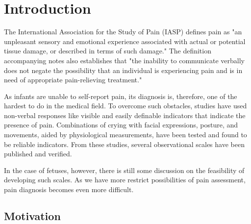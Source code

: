\documentclass[msc]{ppgccufmg}
\begin{document}

\chapter{Introduction}

The International Association for the Study of Pain (IASP) defines pain as "an unpleasant sensory and emotional experience associated with actual or potential tissue damage, or described in terms of such damage." The definition accompanying notes also establishes that "the inability to communicate verbally does not negate the possibility that an individual is experiencing pain and is in need of appropriate pain-relieving treatment." 


As infants are unable to self-report pain, its diagnosis is, therefore, one of the hardest to do in the medical field. To overcome such obstacles, studies have used non-verbal responses like visible and easily definable indicators that indicate the presence of pain. Combinations of crying with facial expressions, posture, and movements, aided by physiological measurements, have been tested and found to be reliable indicators. From these studies, several observational scales have been published and verified. 

In the case of fetuses, however, there is still some discussion on the feasibility of developing such scales. As we have more restrict possibilities of pain assessment, pain diagnosis becomes even more difficult.

\section{Motivation}
\end{document}
